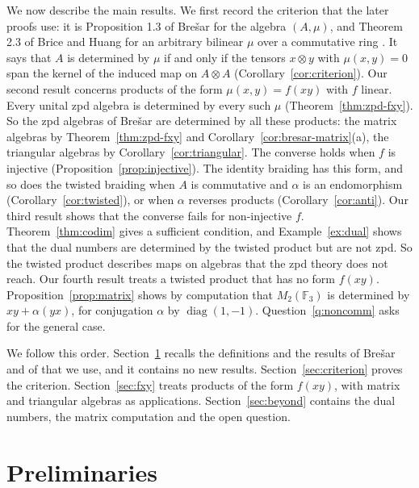 \documentclass[]{interact}
\theoremstyle{plain}
\theoremstyle{definition}
\theoremstyle{remark}
\begin{document}
We now describe the main results.
We first record the criterion that the later proofs use: it is Proposition 1.3 of Bre\v{s}ar for the algebra $(A,\mu)$, and Theorem 2.3 of Brice and Huang for an arbitrary bilinear $\mu$ over a commutative ring \citep{BriceHuang2015}.
It says that $A$ is determined by $\mu$ if and only if the tensors $x \otimes y$ with $\mu(x,y) = 0$ span the kernel of the induced map on $A \otimes A$ (Corollary~\ref{cor:criterion}).
Our second result concerns products of the form $\mu(x,y) = f(xy)$ with $f$ linear.
Every unital zpd algebra is determined by every such $\mu$ (Theorem~\ref{thm:zpd-fxy}).
So the zpd algebras of Bre\v{s}ar are determined by all these products: the matrix algebras by Theorem~\ref{thm:zpd-fxy} and Corollary~\ref{cor:bresar-matrix}(a), the triangular algebras by Corollary~\ref{cor:triangular}.
The converse holds when $f$ is injective (Proposition~\ref{prop:injective}).
The identity braiding has this form, and so does the twisted braiding when $A$ is commutative and $\alpha$ is an endomorphism (Corollary~\ref{cor:twisted}), or when $\alpha$ reverses products (Corollary~\ref{cor:anti}). %
Our third result shows that the converse fails for non-injective $f$.
Theorem~\ref{thm:codim} gives a sufficient condition, and Example~\ref{ex:dual} shows that the dual numbers are determined by the twisted product but are not zpd.
So the twisted product describes maps on algebras that the zpd theory does not reach.
Our fourth result treats a twisted product that has no form $f(xy)$.
Proposition~\ref{prop:matrix} shows by computation that $M_2(\mathbb{F}_3)$ is determined by $xy + \alpha(yx)$, for conjugation $\alpha$ by $\operatorname{diag}(1,-1)$.
Question~\ref{q:noncomm} asks for the general case.

We follow this order.
Section~\ref{sec:prelim} recalls the definitions and the results of Bre\v{s}ar and of \citet{Adrabi2026} that we use, and it contains no new results.
Section~\ref{sec:criterion} proves the criterion.
Section~\ref{sec:fxy} treats products of the form $f(xy)$, with matrix and triangular algebras as applications.
Section~\ref{sec:beyond} contains the dual numbers, the matrix computation and the open question.

\section{Preliminaries}\label{sec:prelim}
\end{document}
